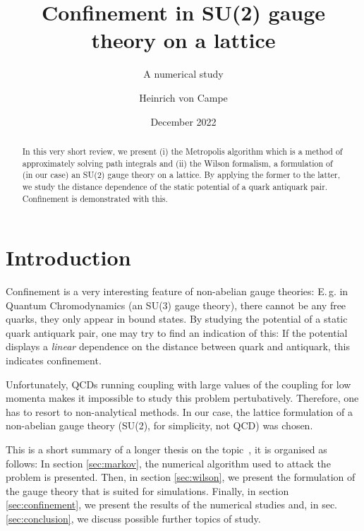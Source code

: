 \documentclass{scrartcl}
\title{Confinement in SU(2) gauge theory on a lattice}
\subtitle{A numerical study}
\date{December 2022}
\author{Heinrich von Campe}
\begin{document}
\maketitle

\begin{abstract}
In this very short review, we present (i) the Metropolis algorithm which is
a method of approximately solving path integrals and (ii) the Wilson formalism,
a formulation of (in our case) an SU(2) gauge theory on a lattice. By applying
the former to the latter, we study the distance dependence of the static potential
of a quark antiquark pair. Confinement is demonstrated with this.
\end{abstract}

\section{Introduction}
Confinement is a very interesting feature of non-abelian gauge theories:
E.\,g. in Quantum Chromodynamics (an SU(3) gauge theory), there cannot be any
free quarks, they only appear in bound states. By studying the potential of a
static quark antiquark pair, one may try to find an indication of this: If the
potential displays a \emph{linear} dependence on the distance between quark and
antiquark, this indicates confinement.

Unfortunately, QCDs running coupling with large values of the coupling for low
momenta makes it impossible to study this problem pertubatively. Therefore, one
has to resort to non-analytical methods. In our case, the lattice formulation
of a non-abelian gauge theory (SU(2), for simplicity, not QCD) was chosen.

This is a short summary of a longer thesis on the topic~\cite{thesis}, it is
organised as follows: In section \ref{sec:markov}, the numerical algorithm used to
attack the problem is presented. Then, in section \ref{sec:wilson}, we present the
formulation of the gauge theory that is suited for simulations. Finally, in
section \ref{sec:confinement}, we present the results of the numerical studies
and, in sec. \ref{sec:conclusion}, we discuss possible further topics
of study.
\end{document}

